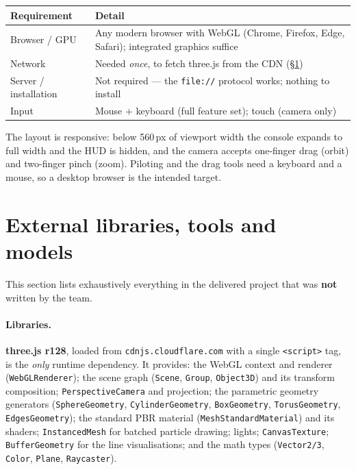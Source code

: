 \documentclass[10pt,a4paper]{article}
\newcommand{\code}[1]{\texttt{\small #1}}
\begin{document}
\begin{center}
\small
\begin{tabular}{@{}ll@{}}
\toprule
\textbf{Requirement} & \textbf{Detail}\\
\midrule
Browser / GPU  & Any modern browser with WebGL (Chrome, Firefox, Edge, Safari); integrated graphics suffice\\
Network        & Needed \emph{once}, to fetch three.js from the CDN (\S\ref{sec:external})\\
Server / installation & Not required --- the \code{file://} protocol works; nothing to install\\
Input          & Mouse + keyboard (full feature set); touch (camera only)\\
\bottomrule
\end{tabular}
\end{center}

\noindent The layout is responsive: below 560\,px of viewport width the console expands to full width and
the HUD is hidden, and the camera accepts one-finger drag (orbit) and two-finger pinch (zoom). Piloting
and the drag tools need a keyboard and a mouse, so a desktop browser is the intended target.

\section{External libraries, tools and models}
\label{sec:external}

This section lists exhaustively everything in the delivered project that was \textbf{not} written by the
team.

\paragraph{Libraries.} \textbf{three.js r128}, loaded from \code{cdnjs.cloudflare.com} with a single
\code{<script>} tag, is the \emph{only} runtime dependency. It provides: the WebGL context and renderer
(\code{WebGLRenderer}); the scene graph (\code{Scene}, \code{Group}, \code{Object3D}) and its transform
composition; \code{PerspectiveCamera} and projection; the parametric geometry generators
(\code{SphereGeometry}, \code{CylinderGeometry}, \code{BoxGeometry}, \code{TorusGeometry},
\code{EdgesGeometry}); the standard PBR material (\code{MeshStandardMaterial}) and its shaders;
\code{InstancedMesh} for batched particle drawing; lights; \code{CanvasTexture}; \code{BufferGeometry} for
the line visualisations; and the math types (\code{Vector2/3}, \code{Color}, \code{Plane},
\code{Raycaster}).
\end{document}

